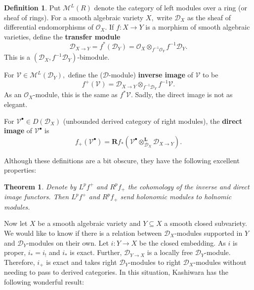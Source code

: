 \documentclass[letterpaper,twosided,11pt]{article}
\theoremstyle{plain}
\newtheorem{theorem}{Theorem}[section]
\theoremstyle{definition}
\newtheorem{definition}{Definition}
\theoremstyle{remark}
\newcommand{\script}[1]{\mathscr{#1}}
\newcommand{\tensor}{\otimes}
\begin{document}
\begin{definition}
    Put $ \mathcal{M}^L(R) $ denote the category of left modules over a
    ring (or sheaf of rings).  For a smooth algebraic variety $ X, $
    write $ \mathcal{D}_X $ as the sheaf of differential endomorphisms
    of $ \mathcal{O}_X. $ If $ f:X\to Y $ is a morphism of smooth
    algebraic varieties, define the \textbf{transfer module}
    \[
        \mathcal{D}_{X\to Y}=f^*(\mathcal{D}_Y)=\mathcal{O}_X\tensor_{f^
        {-1}\mathcal{O}_Y} f^{-1}\mathcal{D}_Y.
    \]
    This is a $ (\mathcal{D}_X,f^{-1}\mathcal{D}_Y) $-bimodule.

    For $ \script{V}\in \mathcal{M}^L(\mathcal{D}_Y), $ define the ($
    \mathcal{D} $-module) \textbf{inverse image} of $ \script{V} $ to be
    \[
        f^+(\script{V})=\mathcal{D}_{X\to Y} \tensor_{f^{-1}\mathcal{D}_Y}
        f^{-1}\script{V}.
    \]
    As an $ \mathcal{O}_X $-module, this is the same as $ f^*\script{V}.
    $ Sadly, the direct image is not as elegant.

    For $ \script{V}^\bullet \in D(\mathcal{D}_X) $ (unbounded derived
    category of right modules), the \textbf{direct image} of $ \script{V}^\bullet
    $ is
    \[
        f_+(\script{V}^\bullet)=\textbf{R}f_*(\script{V}^\bullet \tensor^
        {\textbf{L}}_{\mathcal{D}_X} \mathcal{D}_{X\to Y}).
    \]
\end{definition}

Although these definitions are a bit obscure, they have the following
excellent properties:

\begin{theorem}
    \cite[V.3.1]{MilicicDModules} Denote by $ L^pf^+ $ and $ R^pf_+ $
    the cohomology of the inverse and direct image functors.  Then $ L^pf^+
    $ and $ R^pf_+ $ send holonomic modules to holnomic modules.
\end{theorem}

Now let $ X $ be a smooth algebraic variety and $ Y\subseteq X $ a
smooth closed subvariety.  We would like to know if there is a relation
between $ \mathcal{D}_X $-modules supported in $ Y $ and $ \mathcal{D}_Y
$-modules on their own.  Let $ i:Y\to X $ be the closed embedding.  As $
i $ is proper, $ i_*=i_! $ and $ i_* $ is exact.  Further, $ \mathcal{D}_
{Y\to X} $ is a locally free $ \mathcal{D}_Y $-module.  Therefore, $ i_+
$ is exact and takes right $ \mathcal{D}_Y $-modules to right $ \mathcal
{D}_X $-modules without needing to pass to derived categories.  In this
situation, Kashiwara has the following wonderful result:
\end{document}
